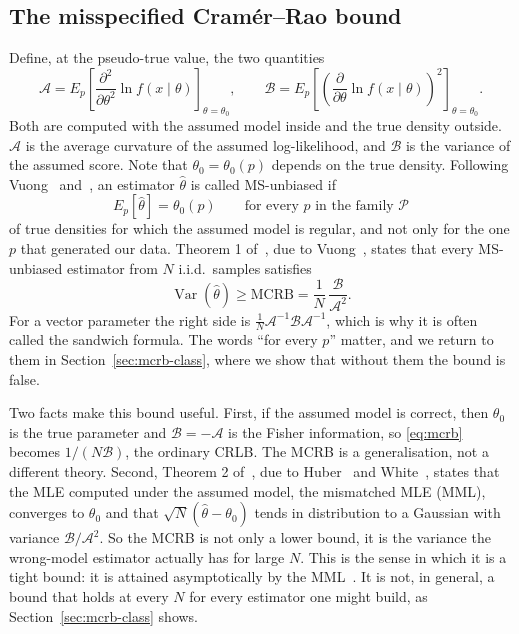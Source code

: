 \documentclass[11pt]{article}
\numberwithin{figure}{section}
\numberwithin{equation}{section}
\begin{document}
\subsection{The misspecified Cram\'er--Rao bound}

Define, at the pseudo-true value, the two quantities~\cite[eqs.~(2), (3)]{fortunati}
\[
  \mathcal{A} = E_p\!\left[\frac{\partial^2}{\partial\theta^2}\ln f(x\mid\theta)\right]_{\theta = \theta_0},
  \qquad
  \mathcal{B} = E_p\!\left[\left(\frac{\partial}{\partial\theta}\ln f(x\mid\theta)\right)^2\right]_{\theta = \theta_0}.
\]
Both are computed with the assumed model inside and the true density outside. $\mathcal{A}$ is the
average curvature of the assumed log-likelihood, and $\mathcal{B}$ is the variance of the assumed
score. Note that $\theta_0 = \theta_0(p)$ depends on the true density. Following
Vuong~\cite{vuong} and~\cite{fortunati2016}, an estimator $\hat\theta$ is called MS-unbiased if
\[
  E_p[\hat\theta] = \theta_0(p) \qquad \text{for every } p \text{ in the family } \mathcal{P}
\]
of true densities for which the assumed model is regular, and not only for the one $p$ that
generated our data. Theorem 1 of~\cite{fortunati}, due to Vuong~\cite{vuong}, states that every
MS-unbiased estimator from $N$ i.i.d.\ samples satisfies
\begin{equation}
  \operatorname{Var}(\hat\theta) \geq \text{MCRB} = \frac{1}{N}\,\frac{\mathcal{B}}{\mathcal{A}^2}.
  \label{eq:mcrb}
\end{equation}
For a vector parameter the right side is $\frac1N \mathcal{A}^{-1}\mathcal{B}\mathcal{A}^{-1}$, which is
why it is often called the sandwich formula. The words ``for every $p$'' matter, and we return to them
in Section~\ref{sec:mcrb-class}, where we show that without them the bound is false.

Two facts make this bound useful. First, if the assumed model is correct, then $\theta_0$ is the
true parameter and $\mathcal{B} = -\mathcal{A}$ is the Fisher information, so \eqref{eq:mcrb} becomes
$1/(N\mathcal{B})$, the ordinary CRLB. The MCRB is a generalisation, not a different theory. Second,
Theorem 2 of~\cite{fortunati}, due to Huber~\cite{huber67} and White~\cite{white}, states that the
MLE computed under the assumed model, the mismatched MLE (MML), converges to $\theta_0$ and that
$\sqrt N(\hat\theta - \theta_0)$ tends in distribution to a Gaussian with variance
$\mathcal{B}/\mathcal{A}^2$. So the MCRB is not only a lower bound, it is the variance the wrong-model
estimator actually has for large $N$. This is the sense in which it is a tight bound: it is
attained asymptotically by the MML~\cite{fortunati}. It is not, in general, a bound that holds at every
$N$ for every estimator one might build, as Section~\ref{sec:mcrb-class} shows.
\end{document}
